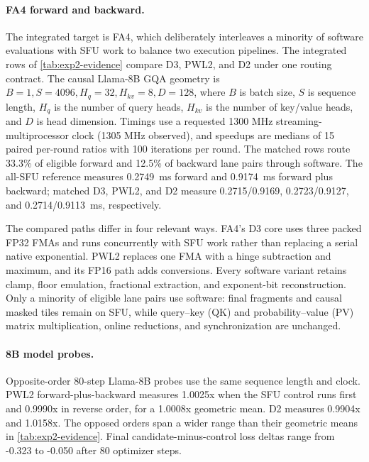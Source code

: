 \paragraph{FA4 forward and backward.}
The integrated target is FA4, which deliberately
interleaves a minority of software evaluations with SFU work to balance two
execution pipelines. The integrated rows of \cref{tab:exp2-evidence} compare
D3, PWL2, and D2 under one routing contract. The causal Llama-8B GQA geometry is
$B=1,S=4096,H_q=32,H_{kv}=8,D=128$, where $B$ is batch size, $S$ is sequence
length, $H_q$ is the number of query heads, $H_{kv}$ is the number of key/value
heads, and $D$ is head dimension. Timings use a requested 1300 MHz
streaming-multiprocessor clock (1305 MHz observed), and speedups are medians of
15 paired per-round
ratios with 100 iterations per round. The matched rows route 33.3\% of
eligible forward and 12.5\% of backward lane pairs through software. The
all-SFU reference measures 0.2749~ms forward and 0.9174~ms forward plus
backward; matched D3, PWL2, and D2 measure 0.2715/0.9169,
0.2723/0.9127, and 0.2714/0.9113~ms, respectively.

The compared paths differ in four relevant ways. FA4's D3 core uses three
packed FP32 FMAs and runs concurrently with SFU work rather than replacing a
serial native exponential. PWL2 replaces one FMA with a hinge subtraction and
maximum, and its FP16 path adds conversions. Every software variant retains
clamp, floor emulation, fractional extraction, and exponent-bit reconstruction.
Only a minority of eligible lane pairs use software: final fragments and causal
masked tiles remain on SFU, while query--key (QK) and probability--value (PV)
matrix multiplication, online reductions, and synchronization are unchanged.

\paragraph{8B model probes.}
Opposite-order 80-step Llama-8B probes use the same sequence length and clock.
PWL2 forward-plus-backward measures 1.0025x when the SFU control runs first and
0.9990x in reverse order, for a 1.0008x geometric mean. D2 measures 0.9904x
and 1.0158x. The opposed orders span a wider range than their geometric means
in \cref{tab:exp2-evidence}. Final candidate-minus-control loss deltas range
from -0.323 to -0.050 after 80 optimizer steps.


